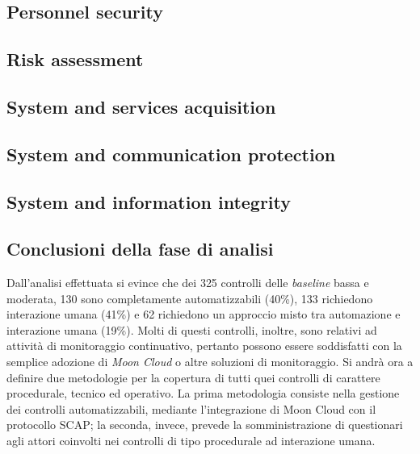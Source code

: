 \documentclass[../main.tex]{subfiles}
\begin{document}
\subsection{Personnel security}


\subsection{Risk assessment}


\subsection{System and services acquisition}


\subsection{System and communication protection}


\subsection{System and information integrity}


\subsection{Conclusioni della fase di analisi}
Dall'analisi effettuata si evince che dei 325 controlli delle \textit{baseline} bassa e moderata, 130 sono completamente automatizzabili (40\%), 133 richiedono interazione umana (41\%) e 62 richiedono un approccio misto tra automazione e interazione umana (19\%).
Molti di questi controlli, inoltre, sono relativi ad attività di monitoraggio continuativo, pertanto possono essere soddisfatti con la semplice adozione di \textit{Moon Cloud} o altre soluzioni di monitoraggio.
Si andrà ora a definire due metodologie per la copertura di tutti quei controlli di carattere procedurale, tecnico ed operativo.
La prima metodologia consiste nella gestione dei controlli automatizzabili, mediante l'integrazione di Moon Cloud con il protocollo SCAP; la seconda, invece, prevede la somministrazione di questionari agli attori coinvolti nei controlli di tipo procedurale ad interazione umana.
\end{document}
